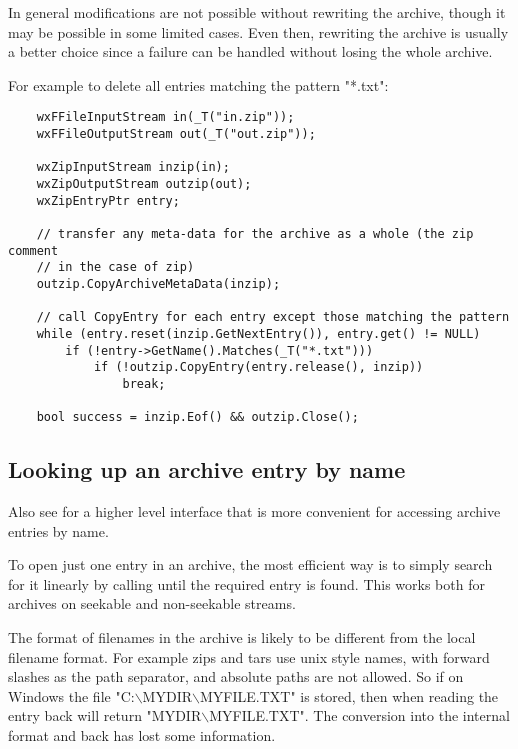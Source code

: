 In general modifications are not possible without rewriting the archive,
though it may be possible in some limited cases. Even then, rewriting
the archive is usually a better choice since a failure can be handled
without losing the whole archive.

For example to delete all entries matching the pattern "*.txt":

\begin{verbatim}
    wxFFileInputStream in(_T("in.zip"));
    wxFFileOutputStream out(_T("out.zip"));

    wxZipInputStream inzip(in);
    wxZipOutputStream outzip(out);
    wxZipEntryPtr entry;

    // transfer any meta-data for the archive as a whole (the zip comment
    // in the case of zip)
    outzip.CopyArchiveMetaData(inzip);

    // call CopyEntry for each entry except those matching the pattern
    while (entry.reset(inzip.GetNextEntry()), entry.get() != NULL)
        if (!entry->GetName().Matches(_T("*.txt")))
            if (!outzip.CopyEntry(entry.release(), inzip))
                break;

    bool success = inzip.Eof() && outzip.Close();

\end{verbatim}


\subsection{Looking up an archive entry by name}\label{wxarcbyname}


Also see  for a higher level interface that is
more convenient for accessing archive entries by name.

To open just one entry in an archive, the most efficient way is
to simply search for it linearly by calling
  until the
required entry is found. This works both for archives on seekable and
non-seekable streams.

The format of filenames in the archive is likely to be different
from the local filename format. For example zips and tars use
unix style names, with forward slashes as the path separator,
and absolute paths are not allowed. So if on Windows the file
"C:$\backslash$MYDIR$\backslash$MYFILE.TXT" is stored, then when reading
the entry back  will return
"MYDIR$\backslash$MYFILE.TXT". The conversion into the internal format
and back has lost some information.

